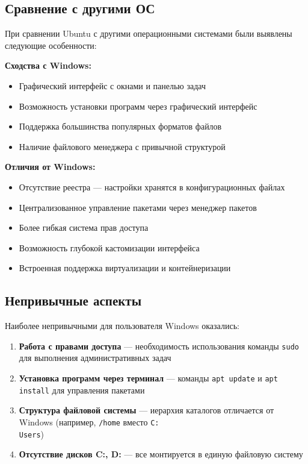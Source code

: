 \subsection{Сравнение с другими ОС}

При сравнении Ubuntu с другими операционными системами были выявлены следующие особенности:

\textbf{Сходства с Windows:}
\begin{itemize}
    \item Графический интерфейс с окнами и панелью задач
    \item Возможность установки программ через графический интерфейс
    \item Поддержка большинства популярных форматов файлов
    \item Наличие файлового менеджера с привычной структурой
\end{itemize}

\textbf{Отличия от Windows:}
\begin{itemize}
    \item Отсутствие реестра --- настройки хранятся в конфигурационных файлах
    \item Централизованное управление пакетами через менеджер пакетов
    \item Более гибкая система прав доступа
    \item Возможность глубокой кастомизации интерфейса
    \item Встроенная поддержка виртуализации и контейнеризации
\end{itemize}

\subsection{Непривычные аспекты}

Наиболее непривычными для пользователя Windows оказались:

\begin{enumerate}
    \item \textbf{Работа с правами доступа} --- необходимость использования команды \texttt{sudo} для выполнения административных задач
    \item \textbf{Установка программ через терминал} --- команды \texttt{apt update} и \texttt{apt install} для управления пакетами
    \item \textbf{Структура файловой системы} --- иерархия каталогов отличается от Windows (например, \texttt{/home} вместо \texttt{C:\\Users})
    \item \textbf{Отсутствие дисков C:, D:} --- все монтируется в единую файловую систему
\end{enumerate}

